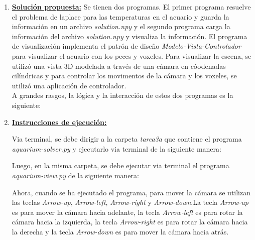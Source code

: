 \documentclass[letterpaper,11pt,oneside]{article}
\begin{document}
	





\begin{enumerate}
    \item \textbf{\underline{Solución propuesta:}} 
        Se tienen dos programas. El primer programa resuelve el problema de laplace para las temperaturas en el acuario y guarda la información en un archivo \textit{solution.npy} y el segundo programa carga la información del archivo \textit{solution.npy} y visualiza la información. El programa de visualización implementa el patrón de diseño \textit{Modelo-Vista-Controlador} para visualizar el acuario con los peces y voxeles. Para visualizar la escena, se utilizó una vista 3D modelada a través de una cámara en cóodenadas cilíndricas y para controlar los movimentos de la cámara y los voxeles, se utilizó una aplicación de controlador.\\

        A grandes rasgos, la lógica y la interacción de estos dos programas es la siguiente:


    \item \textbf{\underline{Instrucciones de ejecución:}} 

        Via terminal, se debe dirigir a la carpeta \textit{tarea3a} que contiene el programa \textit{aquarium-solver.py} y ejecutarlo via terminal de la siguiente manera:


        Luego, en la misma carpeta, se debe ejecutar via terminal el programa \textit{aquarium-view.py} de la siguiente manera:



        Ahora, cuando se ha ejecutado el programa, para mover la cámara se utilizan las teclas \textit{Arrow-up}, \textit{Arrow-left}, \textit{Arrow-right} y \textit{Arrow-down}.La tecla \textit{Arrow-up} es para mover la cámara hacia adelante, la tecla \textit{Arrow-left} es para rotar la cámara hacia la izquierda, la tecla \textit{Arrow-right} es para rotar la cámara hacia la derecha y la tecla \textit{Arrow-down} es para mover la cámara hacia atrás.\\


\end{enumerate}
\end{document}
